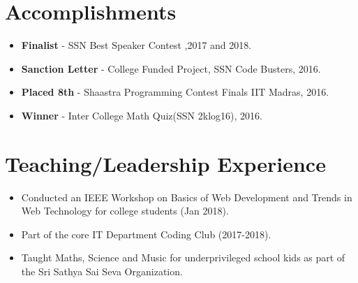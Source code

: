 \documentclass[letterpaper,11pt]{article}
\newcommand{\resumeItem}[2]{
  \item\small{
    \textbf{#1}{ #2 \vspace{-2pt}}
  }
}
\newcommand{\resumeSubItem}[2]{\resumeItem{#1}{#2}\vspace{-4pt}}
\newcommand{\resumeSubHeadingListStart}{\begin{itemize}[leftmargin=*]}
\newcommand{\resumeSubHeadingListEnd}{\end{itemize}}
\begin{document}
\section{Accomplishments}
 \resumeSubHeadingListStart
 \resumeSubItem{}{
    \textbf{Finalist}{ - SSN Best Speaker Contest} {,2017 and 2018.}
    }
    \resumeSubItem{}{
    \textbf{Sanction Letter}{ - College Funded Project}{, SSN Code Busters, 2016. }
    }
    \resumeSubItem{}{
    \textbf{Placed 8th}{ - Shaastra Programming Contest Finals IIT Madras, 2016.}
    }
    \resumeSubItem{}{
    \textbf{Winner}{ - Inter College Math Quiz(SSN 2klog16), 2016.}
    }
    
 \resumeSubHeadingListEnd
\section{Teaching/Leadership Experience}
 \resumeSubHeadingListStart
  \resumeSubItem{}{Conducted an IEEE Workshop on Basics of Web Development and Trends in Web Technology for college students (Jan 2018).}
  \resumeSubItem{}{Part of the core IT Department Coding Club (2017-2018).}
  \resumeSubItem{}{Taught Maths, Science and Music for underprivileged school kids as part of the Sri Sathya Sai Seva Organization.}
 \resumeSubHeadingListEnd
\end{document}
